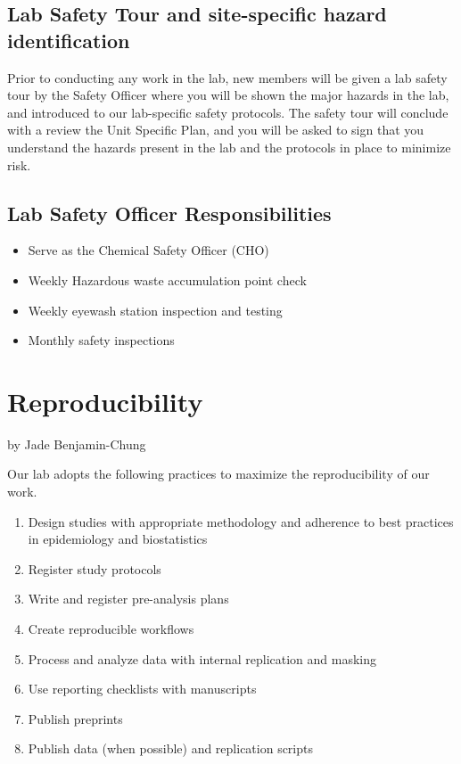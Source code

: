 \documentclass[
]{book}
\providecommand{\tightlist}{%
  \setlength{\itemsep}{0pt}\setlength{\parskip}{0pt}}
\begin{document}
\section{Lab Safety Tour and site-specific hazard identification}\label{lab-safety-tour-and-site-specific-hazard-identification}

Prior to conducting any work in the lab, new members will be given a lab safety tour by the Safety Officer where you will be shown the major hazards in the lab, and introduced to our lab-specific safety protocols. The safety tour will conclude with a review the Unit Specific Plan, and you will be asked to sign that you understand the hazards present in the lab and the protocols in place to minimize risk.

\section{Lab Safety Officer Responsibilities}\label{lab-safety-officer-responsibilities}

\begin{itemize}
\tightlist
\item
  Serve as the Chemical Safety Officer (CHO)
\item
  Weekly Hazardous waste accumulation point check
\item
  Weekly eyewash station inspection and testing
\item
  Monthly safety inspections
\end{itemize}

\chapter{Reproducibility}\label{reproducibility}

by Jade Benjamin-Chung

Our lab adopts the following practices to maximize the reproducibility of our work.

\begin{enumerate}
\def\labelenumi{\arabic{enumi}.}
\tightlist
\item
  Design studies with appropriate methodology and adherence to best practices in epidemiology and biostatistics
\item
  Register study protocols
\item
  Write and register pre-analysis plans
\item
  Create reproducible workflows
\item
  Process and analyze data with internal replication and masking
\item
  Use reporting checklists with manuscripts
\item
  Publish preprints
\item
  Publish data (when possible) and replication scripts
\end{enumerate}
\end{document}
